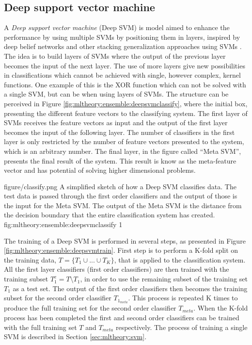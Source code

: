 \subsection{Deep support vector machine}
\label{sec:deepSVM}
A \emph{Deep support vector machine} (Deep SVM) is model aimed to enhance the performance by using multiple SVMs by positioning them in layers, inspired by deep belief networks \cite{hinton2006reducing} and other stacking generalization approaches using SVMs \cite{chen2009using}.
The idea is to build layers of SVMs where the output of the previous layer becomes the input of the next layer. The use of more layers give new possibilities in classifications which cannot be achieved with single, however complex, kernel functions. One example of this is the XOR function which can not be solved with a single SVM, but can be when using layers of SVMs. The structure can be perceived in Figure \ref{fig:mltheory:ensemble:deepsvmclassify}, where the initial box, presenting the different feature vectors to the classifying system. The first layer of SVMs receives the feature vectors as input and the output of the first layer becomes the input of the following layer. The number of classifiers in the first layer is only restricted by the number of feature vectors presented to the system, which is an arbitrary number. The final layer, in the figure called ``Meta SVM'', presents the final result of the system. This result is know as the meta-feature vector and has potential of solving higher dimensional problems.

\singlefigure
{figure/classify.png}
{A simplified sketch of how a Deep SVM classifies data. The test data is passed through the first order classifiers and the output of those is the input for the Meta SVM. The output of the Meta SVM is the distance from the decision boundary that the entire classification system has created.}
{fig:mltheory:ensemble:deepsvmclassify}
{1}

The training of a Deep SVM is performed in several steps, as presented in Figure \ref{fig:mltheory:ensemble:deepsvmtrain}. First step is to perform a K-fold split on the training data, $T=\{T_1\cup...\cup T_K\}$, that is applied to the classification system. All the first layer classifiers (first order classifiers) are then trained with the training subset $T_1^c=T\setminus T_1$, in order to use the remaining subset of the training set $T_1$ as a test set. The output of the first order classifiers then becomes the training subset for the second order classifier $T_{1_{meta}}$. This process is repeated K times to produce the full training set for the second order classifier $T_{meta}$. When the K-fold process has been completed the first and second order classifiers can be trained with the full training set $T$ and $T_{meta}$ respectively. The process of training a single SVM is described in Section \ref{sec:mltheory:svm}.  

